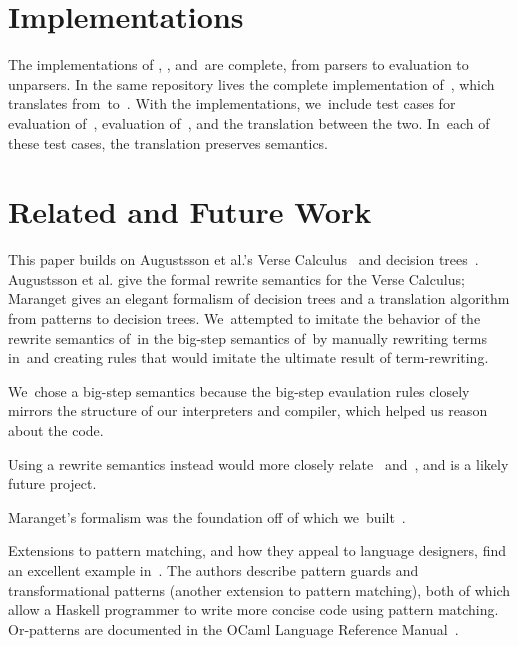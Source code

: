\documentclass[article,screen,12pt, nonacm]{acmart}
\begin{document}
    \section{Implementations}

    The implementations of \VMinus, \PPlus, and~\D are complete, from parsers to
    evaluation to unparsers. In the same repository lives the complete
    implementation of~\DTran, which translates from~\VMinus to~\D. With the
    implementations, we~include test cases for evaluation of~\VMinus, evaluation
    of~\D, and the translation between the two. In~each of these test cases, the
    translation preserves semantics. 


    \section{Related and Future Work}

    This paper builds on Augustsson et al.'s Verse Calculus~\citep{verse} and
    decision trees~\citep{maranget}. Augustsson et al. give the formal rewrite
    semantics for the Verse Calculus; Maranget gives an elegant formalism of
    decision trees and a translation algorithm from patterns to decision trees.
    We~attempted to imitate the behavior of the rewrite semantics of~\VC in the
    big-step semantics of~\VMinus by manually rewriting terms in~\VC and
    creating rules that would imitate the ultimate result of term-rewriting.
    
    
    We~chose a big-step semantics because
    the big-step evaulation rules closely mirrors the structure of our
    interpreters and compiler, which helped us reason about the code. 


    Using a rewrite semantics instead would more closely relate~\VMinus
    and~\VC, and is a likely future project. 
    
    Maranget's formalism was the foundation off of which we~built~\D. 
    
    Extensions to pattern matching, and how they appeal to language designers,
    find an excellent example in~\citet{guardproposal}. The authors describe
    pattern guards and transformational patterns (another extension to pattern
    matching), both of which allow a Haskell programmer to write more concise
    code using pattern matching. Or-patterns are documented in the OCaml
    Language Reference Manual~\citep{ocaml}.
    
\end{document}
